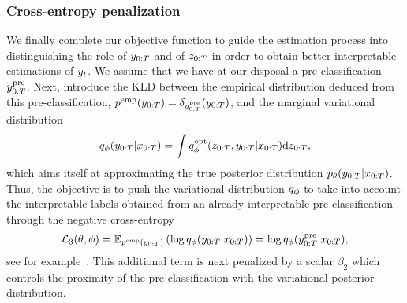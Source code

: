 
\subsubsection{Cross-entropy penalization}
We finally complete our objective function 
to guide the estimation process
into distinguishing the role of $y_{0:T}$ and of $z_{0:T}$ 
in order to obtain better interpretable estimations of $y_t$.
We assume that we have at our disposal
a pre-classification $y_{0:T}^{\mathrm{pre}}$. 
Next, introduce
the KLD between the empirical distribution 
deduced from this pre-classification,
$p^{\rm emp}(y_{0:T})=\delta_{y_{0:T}^{\rm pre}}(y_{0:T})$, 
and the marginal variational distribution 
$$q_\phi(y_{0:T}|x_{0:T})=\int q_\phi^{\rm opt}(z_{0:T},y_{0:T}|x_{0:T}){\rm d}z_{0:T},$$
which aims itself at approximating the true posterior distribution $p_{\theta}(y_{0:T}|x_{0:T})$. Thus, the objective is to push the variational distribution $q_\phi$ to take into account the interpretable labels obtained from an already interpretable pre-classification through the negative cross-entropy 
\begin{equation}
\label{L-3}
 \mathcal{L}_3(\theta,\phi) = {\mathbb{E}}_{p ^{\rm emp}(y_{0:T})} \left(\log q_\phi(y_{0:T}|x_{0:T}) \right)=\log q_\phi(y^{\rm pre}_{0:T}|x_{0:T}),
\end{equation}
see for example~\citep{kingma2014semi,klys2018learning,kumar2021learning}. This additional term
is next penalized by a scalar $\beta_2$ which controls the proximity 
of the pre-classification with the variational posterior distribution.

